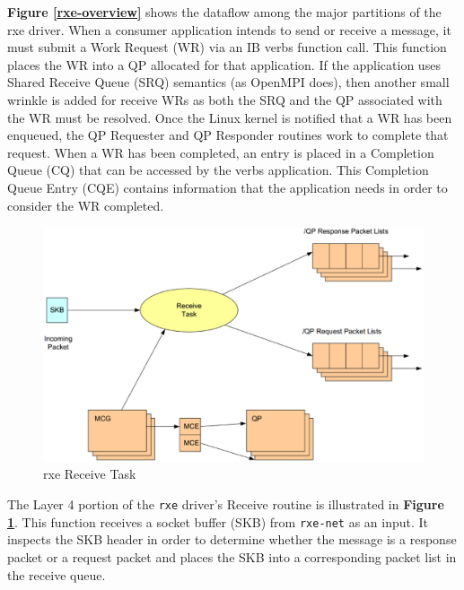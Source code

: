\documentclass[11pt]{book}
\begin{document}
\textbf{Figure \ref{rxe-overview}} shows the dataflow among the major partitions
of the rxe driver. When a consumer application intends to send or receive a
message, it must submit a Work Request (WR) via an IB verbs function call. This
function places the WR into a QP allocated for that application. If the
application uses Shared Receive Queue (SRQ) semantics (as OpenMPI does), then
another small wrinkle is added for receive WRs as both the SRQ and the QP
associated with the WR must be resolved. Once the Linux kernel is notified that
a WR has been enqueued, the QP Requester and QP Responder routines work to
complete that request. When a WR has been completed, an entry is placed in a
Completion Queue (CQ) that can be accessed by the verbs application. This
Completion Queue Entry (CQE) contains information that the application needs in
order to consider the WR completed.

\begin{figure}[h]
\includegraphics[width=\textwidth]{rxe_recv}
\caption{rxe Receive Task \protect\cite{pearson-10}}
\label{rxe-recv}
\end{figure}

The Layer 4 portion of the \verb;rxe; driver's Receive routine is illustrated in
\textbf{Figure \ref{rxe-recv}}. This function receives a socket buffer (SKB)
from \verb;rxe-net; as an input. It inspects the SKB header in order to
determine whether the message is a response packet or a request packet and
places the SKB into a corresponding packet list in the receive queue.
\end{document}
